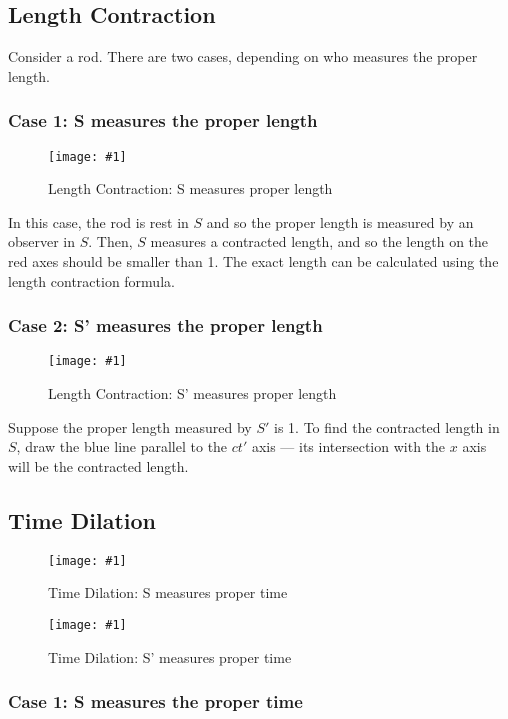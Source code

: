 \documentclass[a4paper,12pt]{article}
\newcommand{\img}[4]{\begin{center}
  \begin{figure}[H]
    \centering
    \texttt{[image: \#1]}
    \caption{#3}
    \label{fig:#4}
  \end{figure}
\end{center}}
\begin{document}
\pagebreak


\subsection{Length Contraction}

Consider a rod. There are two cases, depending on who measures the proper length.

\subsubsection*{Case 1: S measures the proper length}

\img{rod1.png}{0.7}{Length Contraction: S measures proper length}{rod1}

In this case, the rod is rest in $S$ and so the proper length is measured by an observer in $S$. Then, $S$ measures a contracted length, and so the length on the red axes should be smaller than 1. The exact length can be calculated using the length contraction formula.

\pagebreak

\subsubsection*{Case 2: S' measures the proper length}

\img{rod2.png}{0.7}{Length Contraction: S' measures proper length}{rod1}

Suppose the proper length measured by $S'$ is 1. To find the contracted length in $S$, draw the \textcolor{blue!60!black!80}{blue line} parallel to the $ct'$ axis --- its intersection with the $x$ axis will be the contracted length.

\pagebreak

\subsection{Time Dilation}

\begin{minipage}{0.475\textwidth}
  \img{clock1.png}{1}{Time Dilation: S measures proper time}{clock1}
\end{minipage}\hspace*{0.05\textwidth}%
\begin{minipage}{0.475\textwidth}
  \img{clock2.png}{1}{Time Dilation: S' measures proper time}{clock2}
\end{minipage}

\subsubsection*{Case 1: S measures the proper time}
\end{document}
